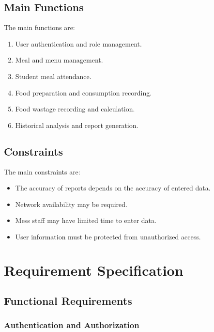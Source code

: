 \documentclass[12pt,a4paper]{report}
\begin{document}
	\section{Main Functions}
	
	The main functions are:
	
	\begin{enumerate}[leftmargin=*]
		\item User authentication and role management.
		\item Meal and menu management.
		\item Student meal attendance.
		\item Food preparation and consumption recording.
		\item Food wastage recording and calculation.
		\item Historical analysis and report generation.
	\end{enumerate}
	
	
	\section{Constraints}
	
	The main constraints are:
	
	\begin{itemize}[leftmargin=*]
		\item The accuracy of reports depends on the accuracy of entered data.
		\item Network availability may be required.
		\item Mess staff may have limited time to enter data.
		\item User information must be protected from unauthorized access.
	\end{itemize}
	

	
	\chapter{Requirement Specification}
	
	\section{Functional Requirements}
	
	\subsection{Authentication and Authorization}
	
\end{document}
